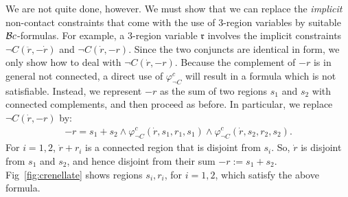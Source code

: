 \documentclass{article}
\newcommand{\tseq}[1]{\mathfrak{#1}}
\newcommand{\intermediate}[1]{\dot{#1}}
\newcommand{\inner}[1]{\ddot{#1}}
\renewcommand{\phi}{\varphi}
\begin{document}
We are not quite done, however. We must show that we can replace the
{\em implicit} non-contact constraints that come with the use of
3-region variables by suitable $\mathcal{B}c$-formulas.  For example, a
3-region variable $\tseq{r}$ involves the implicit constraints
$\neg C(\inner{r}, -\intermediate{r})$ and $\neg
C(\intermediate{r}, -r)$. Since the two conjuncts are identical in form,
we only show how to deal with $\neg C(\intermediate{r}, -r)$.
Because the complement of $-r$ is  in general not connected, a direct 
use of $\phi_{\lnot C}^c$ will result in a formula which is not satisfiable. 
Instead, we represent $-r$ as the sum of two regions $s_1$ and $s_2$
with connected complements, and then proceed as before. In particular, we replace 
$\neg C(\intermediate{r}, -r)$ by:
\begin{eqnarray*}
	-r=s_1+s_2\land  \phi_{\lnot C}^c(\intermediate r,s_1,r_1,s_1) 
	\land \phi_{\lnot C}^c(\intermediate r,s_2,r_2,s_2).
\end{eqnarray*}
For $i=1,2$, $\intermediate r+r_i$ is a connected region that is disjoint from
$s_i$. So, $\intermediate r$ is disjoint from $s_1$ and $s_2$, and hence 
disjoint from their sum $-r:=s_1+s_2$. Fig~\ref{fig:crenellate} shows regions 
$s_i,r_i$, for $i=1,2$, which satisfy the above formula.
\end{document}
